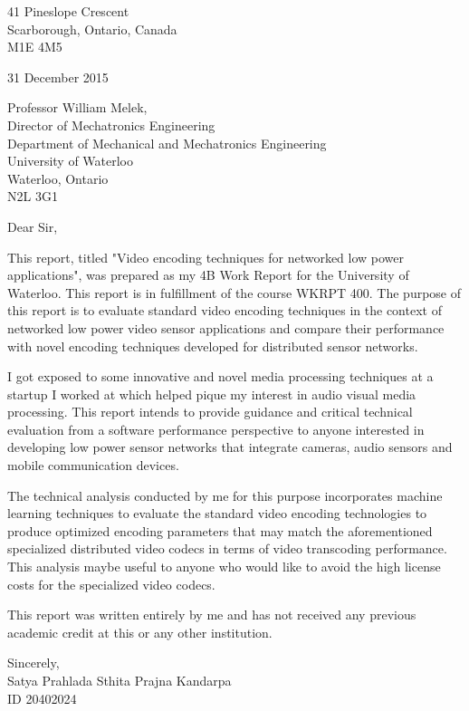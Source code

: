 \begin{flushleft}
    41 Pineslope Crescent\\
    Scarborough, Ontario, Canada\\
    M1E 4M5
    
    31 December 2015
    
    Professor William Melek,\\
    Director of Mechatronics Engineering\\
    Department of Mechanical and Mechatronics Engineering\\
    University of Waterloo\\
    Waterloo, Ontario\\
    N2L 3G1
    
    Dear Sir,

    This report, titled "Video encoding techniques for networked low power applications", was prepared as my 4B Work Report for the University of Waterloo. This report is in fulfillment of the course WKRPT 400. The purpose of this report is to evaluate standard video encoding techniques in the context of networked low power video sensor applications and compare their performance with novel encoding techniques developed for distributed sensor networks.
    
    I got exposed to some innovative and novel media processing techniques at a startup I worked at which helped pique my interest in audio visual media processing. This report intends to provide guidance and critical technical evaluation from a software performance perspective to anyone interested in developing low power sensor networks that integrate cameras, audio sensors and mobile communication devices. 

    The technical analysis conducted by me for this purpose incorporates machine learning techniques to evaluate the standard video encoding technologies to produce optimized encoding parameters that may match the aforementioned specialized distributed video codecs in terms of video transcoding performance. This analysis maybe useful to anyone who would like to avoid the high license costs for the specialized video codecs.  
    
    This report was written entirely by me and has not received any previous academic credit at this or any other institution. 

    Sincerely,\\
    Satya Prahlada Sthita Prajna Kandarpa\\
    ID 20402024\\
\end{flushleft}
\cleardoublepage

